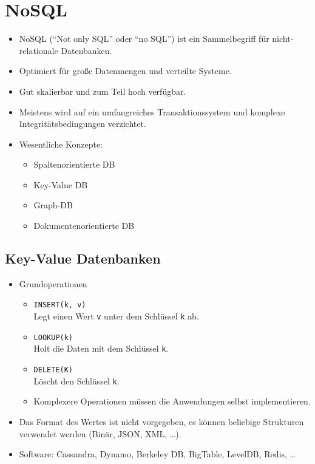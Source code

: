    \section{NoSQL} %
        \begin{itemize}
        	\item NoSQL (\enquote{Not only SQL} oder \enquote{no SQL}) ist ein Sammelbegriff für nicht-relationale Datenbanken.
        	\item Optimiert für große Datenmengen und verteilte Systeme.
        	\item Gut skalierbar und zum Teil hoch verfügbar.
        	\item Meistens wird auf ein umfangreiches Transaktionssystem und komplexe Integritätsbedingungen verzichtet.
        	\item Wesentliche Konzepte:
        		\begin{itemize}
        			\item Spaltenorientierte DB
        			\item Key-Value DB
        			\item Graph-DB
        			\item Dokumentenorientierte DB
        		\end{itemize}
        \end{itemize}

        \subsection{Key-Value Datenbanken} %
            \begin{itemize}
            	\item Grundoperationen
            		\begin{itemize}
            			\item \texttt{INSERT(k, v)} \\ Legt einen Wert \texttt{v} unter dem Schlüssel \texttt{k} ab.
            			\item \texttt{LOOKUP(k)} \\ Holt die Daten mit dem Schlüssel \texttt{k}.
            			\item \texttt{DELETE(K)} \\ Löscht den Schlüssel \texttt{k}.
            			\item Komplexere Operationen müssen die Anwendungen selbst implementieren.
            		\end{itemize}
            	\item Das Format des Wertes ist nicht vorgegeben, es können beliebige Strukturen verwendet werden (Binär, JSON, XML, \dots).
            	\item Software: Cassandra, Dynamo, Berkeley DB, BigTable, LevelDB, Redis, \dots
            \end{itemize}

